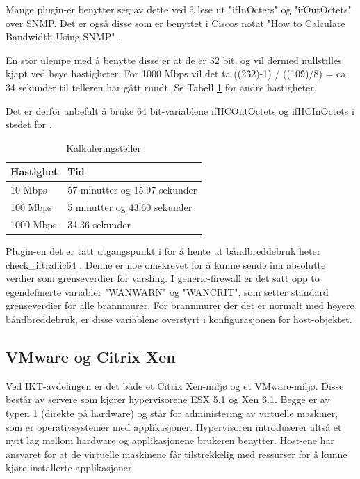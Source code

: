 Mange plugin-er benytter seg av dette ved å lese ut "ifInOctets" og "ifOutOctets" over SNMP. Det er også disse som er benyttet i Ciscos notat "How to Calculate Bandwidth Using SNMP" \cite{ciscobandwidth}. 

En stor ulempe med å benytte disse er at de er 32 bit, og vil dermed nullstilles kjapt ved høye hastigheter. For 1000 Mbps vil det ta ((2\^32)-1) / ((10\^9)/8) = ca. 34 sekunder til telleren har gått rundt. Se Tabell \ref{kalkulering_teller} for andre hastigheter.

Det er derfor anbefalt å bruke 64 bit-variablene ifHCOutOctets og ifHCInOctets i stedet for \cite{ciscosnmpcounters}.
\begin{table}
\begin{center}
\begin{tabular}{ | l | p{7cm} |} \hline
    \textbf{Hastighet} & \textbf{Tid} \\ \hline
    10 Mbps & 57 minutter og 15.97 sekunder \\ \hline
    100 Mbps & 5 minutter og 43.60 sekunder \\ \hline
    1000 Mbps & 34.36 sekunder \\ \hline
\end{tabular}
\caption{Kalkuleringsteller}
\label{kalkulering_teller}
\end{center}
\end{table}
Plugin-en det er tatt utgangspunkt i for å hente ut båndbreddebruk heter check\_iftraffic64 \cite{checkciscoif}. Denne er noe omskrevet for å kunne sende inn absolutte verdier som grenseverdier for varsling. I generic-firewall er det satt opp to egendefinerte variabler "WANWARN" og "WANCRIT", som setter standard grenseverdier for alle brannmurer. For brannmurer der det er normalt med høyere båndbreddebruk, er disse variablene overstyrt i konfigurasjonen for host-objektet.

\subsection{VMware og Citrix Xen}
Ved IKT-avdelingen er det både et Citrix Xen-miljø og et VMware-miljø. Disse består av servere som kjører hypervisorene ESX 5.1 og Xen 6.1. Begge er av typen 1 (direkte på hardware) og står for administering av virtuelle maskiner, som er operativsystemer med applikasjoner. Hypervisoren introduserer altså et nytt lag mellom hardware og applikasjonene brukeren benytter. Host-ene har ansvaret for at de virtuelle maskinene får tilstrekkelig med ressurser for å kunne kjøre installerte applikasjoner. 

